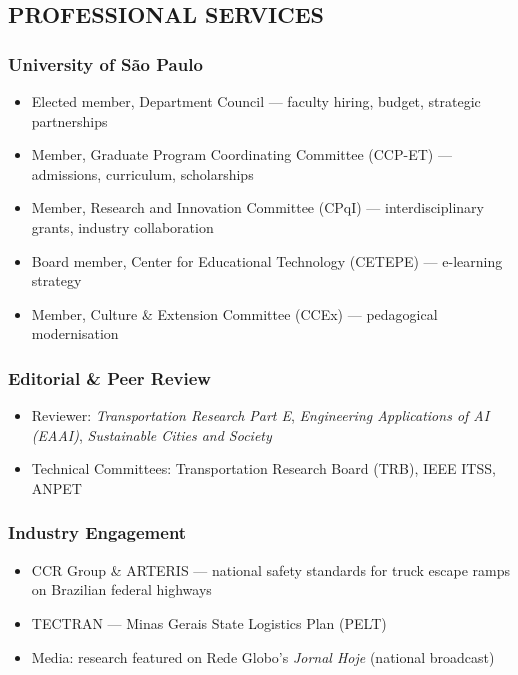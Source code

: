 \documentclass[
  10pt,
  a4paper,
  DIV=11,
  numbers=noendperiod]{scrartcl}
\providecommand{\tightlist}{%
  \setlength{\itemsep}{0pt}\setlength{\parskip}{0pt}}
\begin{document}
\subsection{PROFESSIONAL SERVICES}\label{professional-services}

\subsubsection{University of São
Paulo}\label{university-of-suxe3o-paulo}

\begin{itemize}
\tightlist
\item
  Elected member, Department Council --- faculty hiring, budget,
  strategic partnerships
\item
  Member, Graduate Program Coordinating Committee (CCP-ET) ---
  admissions, curriculum, scholarships
\item
  Member, Research and Innovation Committee (CPqI) --- interdisciplinary
  grants, industry collaboration
\item
  Board member, Center for Educational Technology (CETEPE) ---
  e-learning strategy
\item
  Member, Culture \& Extension Committee (CCEx) --- pedagogical
  modernisation
\end{itemize}

\subsubsection{Editorial \& Peer Review}\label{editorial-peer-review}

\begin{itemize}
\tightlist
\item
  Reviewer: \emph{Transportation Research Part E}, \emph{Engineering
  Applications of AI (EAAI)}, \emph{Sustainable Cities and Society}
\item
  Technical Committees: Transportation Research Board (TRB), IEEE ITSS,
  ANPET
\end{itemize}

\subsubsection{Industry Engagement}\label{industry-engagement}

\begin{itemize}
\tightlist
\item
  CCR Group \& ARTERIS --- national safety standards for truck escape
  ramps on Brazilian federal highways
\item
  TECTRAN --- Minas Gerais State Logistics Plan (PELT)
\item
  Media: research featured on Rede Globo's \emph{Jornal Hoje} (national
  broadcast)
\end{itemize}
\end{document}
